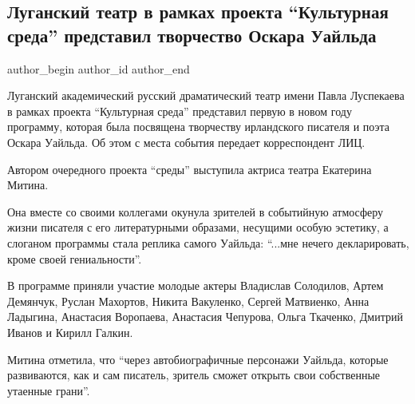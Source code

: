  
 
 
 
 
\subsection{Луганский театр в рамках проекта \enquote{Культурная среда} представил творчество Оскара Уайльда}
\label{sec:05_01_2022.stz.news.lnr.lug_info.1.teatr_oskar_uald}

\ifcmt
 author_begin
   author_id  
 author_end
\fi

Луганский академический русский драматический театр имени Павла Луспекаева в
рамках проекта \enquote{Культурная среда} представил первую в новом году программу,
которая была посвящена творчеству ирландского писателя и поэта Оскара Уайльда.
Об этом с места события передает корреспондент ЛИЦ.


Автором очередного проекта \enquote{среды} выступила актриса театра Екатерина Митина.

Она вместе со своими коллегами окунула зрителей в событийную атмосферу жизни
писателя с его литературными образами, несущими особую эстетику, а слоганом
программы стала реплика самого Уайльда: \enquote{...мне нечего декларировать, кроме своей
гениальности}.


В программе приняли участие молодые актеры Владислав Солодилов, Артем Демянчук,
Руслан Махортов, Никита Вакуленко, Сергей Матвиенко, Анна Ладыгина, Анастасия
Воропаева, Анастасия Чепурова, Ольга Ткаченко, Дмитрий Иванов и Кирилл Галкин.

Митина отметила, что \enquote{через автобиографичные персонажи Уайльда, которые
развиваются, как и сам писатель, зритель сможет открыть свои собственные
утаенные грани}.

